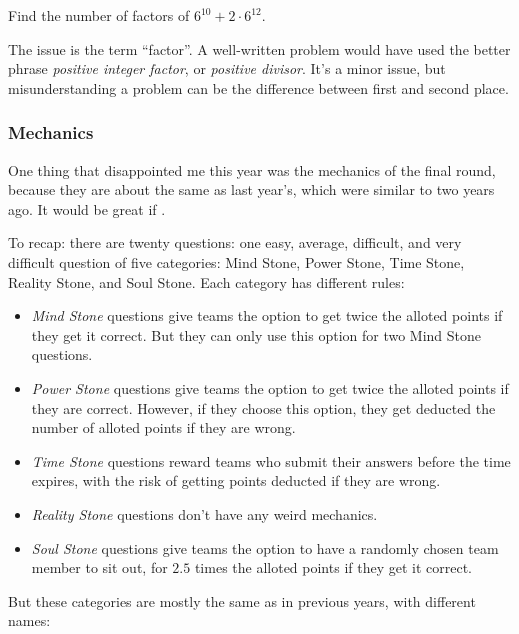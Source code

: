 \documentclass[11pt,paper=letter]{scrartcl}
\begin{document}
\begin{probboxed}
   Find the number of factors of $6^{10} + 2 \cdot 6^{12}$.
\end{probboxed}

The issue is the term ``factor''. A well-written problem would have used the better phrase \emph{positive integer factor}, or \emph{positive divisor}. It's a minor issue, but misunderstanding a problem can be the difference between first and second place.

\subsubsection*{Mechanics}

One thing that disappointed me this year was the mechanics of the final round, because they are about the same as last year's, which were similar to two years ago. It would be great if .

To recap: there are twenty questions: one easy, average, difficult, and very difficult question of five categories: Mind Stone, Power Stone, Time Stone, Reality Stone, and Soul Stone. Each category has different rules:

\begin{itemize}
  \item \emph{Mind Stone} questions give teams the option to get twice the alloted points if they get it correct. But they can only use this option for two Mind Stone questions.

  \item \emph{Power Stone} questions give teams the option to get twice the alloted points if they are correct. However, if they choose this option, they get deducted the number of alloted points if they are wrong.

  \item \emph{Time Stone} questions reward teams who submit their answers before the time expires, with the risk of getting points deducted if they are wrong.

  \item \emph{Reality Stone} questions don't have any weird mechanics.

  \item \emph{Soul Stone} questions give teams the option to have a randomly chosen team member to sit out, for $2.5$ times the alloted points if they get it correct.
\end{itemize}

But these categories are mostly the same as in previous years, with different names:
\end{document}
